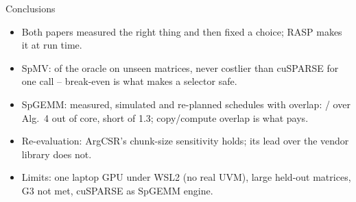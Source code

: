 \documentclass[aspectratio=169,11pt]{beamer}
\begin{document}
\begin{frame}{Conclusions}
\begin{itemize}
\item Both papers measured the right thing and then fixed a choice; RASP makes it at run time.
\item SpMV: \x{} of the oracle on unseen matrices, never costlier than cuSPARSE for one call --
  break-even is what makes a selector safe.
\item SpGEMM: measured, simulated and re-planned schedules with overlap: \x{} / \x{}
  over Alg.~4 out of core, short of 1.3\x; copy/compute overlap is what pays.
\item Re-evaluation: ArgCSR's chunk-size sensitivity holds; its lead over the vendor library does not.
\item Limits: one laptop GPU under WSL2 (no real UVM),  large held-out matrices, G3 not met,
  cuSPARSE as SpGEMM engine.
\end{itemize}
\end{frame}
\end{document}

